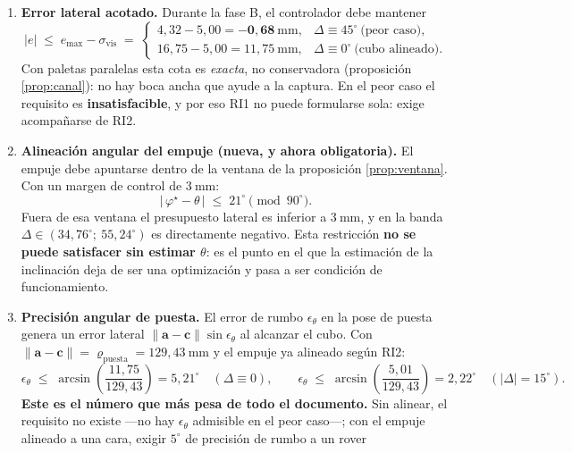 \documentclass[11pt,a4paper]{article}
\theoremstyle{definition}
\newcommand{\cc}{\mathbf{c}}
\newcommand{\aaa}{\mathbf{a}}
\newcommand{\grados}{^{\circ}}
\begin{document}
\begin{enumerate}[label=RI\arabic*.,leftmargin=3em,itemsep=3pt]
\item \textbf{Error lateral acotado.} Durante la fase B, el controlador debe mantener
      \[
        |e| \;\le\; e_{\max} - \sigma_{\mathrm{vis}}
        \;=\;
        \begin{cases}
          4{,}32 - 5{,}00 = \mathbf{-0{,}68}\ \mathrm{mm}, & \Delta \equiv 45\grados \ \text{(peor caso)},\\[3pt]
          16{,}75 - 5{,}00 = 11{,}75\ \mathrm{mm}, & \Delta \equiv 0\grados \ \text{(cubo alineado)}.
        \end{cases}
      \]
      Con paletas paralelas esta cota es \emph{exacta}, no conservadora
      (proposición \ref{prop:canal}): no hay boca ancha que ayude a la captura. En el
      peor caso el requisito es \textbf{insatisfacible}, y por eso RI1 no puede
      formularse sola: exige acompañarse de RI2.
\item \textbf{Alineación angular del empuje (nueva, y ahora obligatoria).} El empuje debe
      apuntarse dentro de la ventana de la proposición \ref{prop:ventana}. Con un margen
      de control de $3\ \mathrm{mm}$:
      \[
        \boxed{\ \big|\,\varphi^\star - \theta\,\big| \;\le\; 21\grados \pmod{90\grados}.\ }
      \]
      Fuera de esa ventana el presupuesto lateral es inferior a $3\ \mathrm{mm}$, y en la
      banda $\Delta \in (34{,}76\grados;\ 55{,}24\grados)$ es directamente negativo. Esta
      restricción \textbf{no se puede satisfacer sin estimar $\theta$}: es el punto en el
      que la estimación de la inclinación deja de ser una optimización y pasa a ser
      condición de funcionamiento.
\item \textbf{Precisión angular de puesta.} El error de rumbo $\epsilon_\theta$ en la
      pose de puesta genera un error lateral
      $\|\aaa-\cc\|\sin\epsilon_\theta$ al alcanzar el cubo. Con
      $\|\aaa-\cc\| = \varrho_{\mathrm{puesta}} = 129{,}43\ \mathrm{mm}$ y el empuje ya
      alineado según RI2:
      \[
        \epsilon_\theta \;\le\; \arcsin\!\left(\frac{11{,}75}{129{,}43}\right) = 5{,}21\grados
        \quad (\Delta \equiv 0),
        \qquad
        \epsilon_\theta \;\le\; \arcsin\!\left(\frac{5{,}01}{129{,}43}\right) = 2{,}22\grados
        \quad (|\Delta| = 15\grados).
      \]
      \textbf{Este es el número que más pesa de todo el documento.} Sin alinear, el
      requisito no existe ---no hay $\epsilon_\theta$ admisible en el peor caso---; con
      el empuje alineado a una cara, exigir $5\grados$ de precisión de rumbo a un rover

\end{enumerate}
\end{document}

